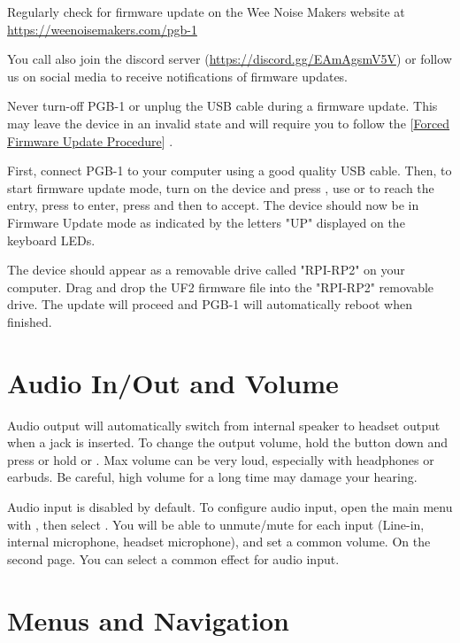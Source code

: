 \documentclass[8pt]{extarticle}
\def\device{PGB-1 }
\def\WNM{Wee Noise Makers }
\def\firmwareupdatesurl{https://weenoisemakers.com/pgb-1}
\def\discordurl{https://discord.gg/EAmAgsmV5V}
\newcommand{\reflabel}[2]{
[\hyperref[#1]{#2}]
}
\begin{document}
\begin{multicols*}{3}
Regularly check for firmware update on the \WNM website at
\url{\firmwareupdatesurl} \qrcode[height=40pt]{\firmwareupdatesurl}

You call also join the discord server (\url{\discordurl}) or follow us on social media to receive notifications of firmware updates. 

\begin{important}
    Never turn-off \device or unplug the USB cable during a firmware update. This may leave the device in an invalid state and will require you to follow the \reflabel{procedures:forced_firmware_update}{Forced Firmware Update Procedure}.
\end{important}

First, connect \device to your computer using a good quality USB cable. Then, to start firmware update mode, turn on the device and press , use  or  to reach the  entry, press  to enter, press  and then  to accept. The device should now be in Firmware Update mode as indicated by the letters "UP" displayed on the keyboard LEDs.

The device should appear as a removable drive called "RPI-RP2" on your computer. Drag and drop the UF2 firmware file into the "RPI-RP2" removable drive. The update will proceed and \device will automatically reboot when finished.

\section{Audio In/Out and Volume}

Audio output will automatically switch from internal speaker to headset output when a jack is inserted. To change the output volume, hold the  button down and press or hold  or . Max volume can be very loud, especially with headphones or earbuds. Be careful, high volume for a long time may damage your hearing.

Audio input is disabled by default. To configure audio input, open the main menu with , then select . You will be able to unmute/mute for each input (Line-in, internal microphone, headset microphone), and set a common volume. On the second page. You can select a common effect for audio input.

\section{Menus and Navigation}


\end{multicols*}
\end{document}
